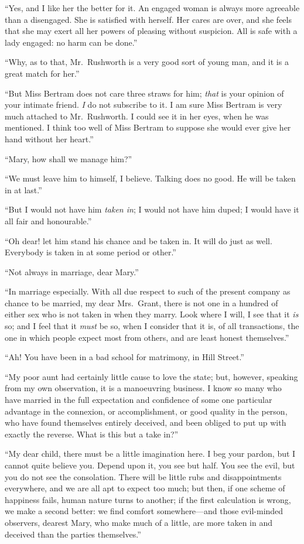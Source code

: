 ``Yes, and I like her the better for it.  An engaged
woman is always more agreeable than a disengaged.
She is satisfied with herself.  Her cares are over,
and she feels that she may exert all her powers of pleasing
without suspicion.  All is safe with a lady engaged:
no harm can be done.''

``Why, as to that, Mr.\ Rushworth is a very good sort
of young man, and it is a great match for her.''

``But Miss Bertram does not care three straws for him;
\emph{that} is your opinion of your intimate friend.  \emph{I} do
not subscribe to it.  I am sure Miss Bertram is very much
attached to Mr.\ Rushworth.  I could see it in her eyes,
when he was mentioned.  I think too well of Miss Bertram
to suppose she would ever give her hand without her heart.''

``Mary, how shall we manage him?''

``We must leave him to himself, I believe.  Talking does
no good.  He will be taken in at last.''

``But I would not have him \emph{taken in}; I would not have
him duped; I would have it all fair and honourable.''

``Oh dear! let him stand his chance and be taken in.
It will do just as well.  Everybody is taken in at some
period or other.''

``Not always in marriage, dear Mary.''

``In marriage especially.  With all due respect to such
of the present company as chance to be married, my dear
Mrs.\ Grant, there is not one in a hundred of either sex
who is not taken in when they marry.  Look where I will,
I see that it \emph{is} so; and I feel that it \emph{must} be so,
when I consider that it is, of all transactions, the one
in which people expect most from others, and are least
honest themselves.''

``Ah!  You have been in a bad school for matrimony,
in Hill Street.''

``My poor aunt had certainly little cause to love
the state; but, however, speaking from my own observation,
it is a manoeuvring business.  I know so many who
have married in the full expectation and confidence
of some one particular advantage in the connexion,
or accomplishment, or good quality in the person, who have
found themselves entirely deceived, and been obliged
to put up with exactly the reverse.  What is this but a take in?''

``My dear child, there must be a little imagination here.
I beg your pardon, but I cannot quite believe you.
Depend upon it, you see but half.  You see the evil,
but you do not see the consolation.  There will be
little rubs and disappointments everywhere, and we
are all apt to expect too much; but then, if one scheme
of happiness fails, human nature turns to another;
if the first calculation is wrong, we make a second better:
we find comfort somewhere---and those evil-minded observers,
dearest Mary, who make much of a little, are more taken
in and deceived than the parties themselves.''


